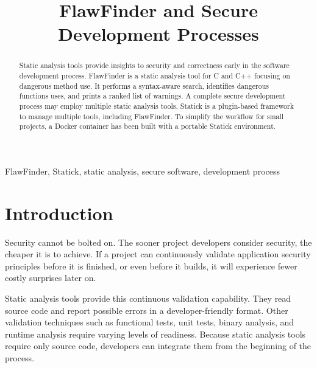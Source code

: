 \documentclass[journal]{IEEEtran}
\begin{document}

\title{FlawFinder and Secure Development Processes}

\author{
}

\maketitle



\begin{abstract}
Static analysis tools provide insights to security and correctness early in the software development
process. FlawFinder is a static analysis tool for C and C++ focusing on dangerous method use. It
performs a syntax-aware search, identifies dangerous functions uses, and prints a ranked list of
warnings. A complete secure development process may employ multiple static analysis tools. Statick
is a plugin-based framework to manage multiple tools, including FlawFinder. To simplify the workflow
for small projects, a Docker container has been built with a portable Statick environment.
\end{abstract}

\begin{IEEEkeywords}
FlawFinder, Statick, static analysis, secure software, development process
\end{IEEEkeywords}



\section{Introduction}

Security cannot be bolted on. The sooner project developers consider security, the cheaper it is to
achieve. If a project can continuously validate application security principles before it is
finished, or even before it builds, it will experience fewer costly surprises later on.

Static analysis tools provide this continuous validation capability. They read source code and
report possible errors in a developer-friendly format. Other validation techniques such as
functional tests, unit tests, binary analysis, and runtime analysis require varying levels of
readiness. Because static analysis tools require only source code, developers can integrate them
from the beginning of the process.
\end{document}
